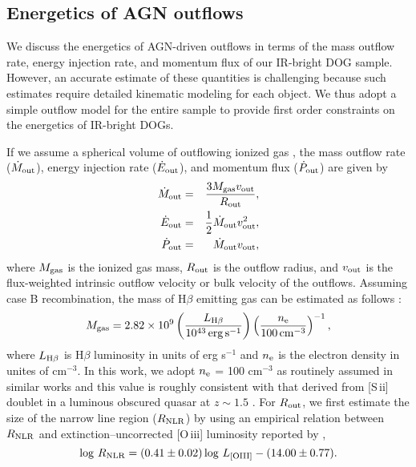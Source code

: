 \documentclass[twocolumn]{aastex6}
\newcommand{\oiii}{[O{\,\sc iii}]\,\,}
\newcommand{\sii}{[S{\,\sc ii}]\,\,}
\begin{document}
\subsection{Energetics of AGN outflows}
We discuss the energetics of AGN-driven outflows in terms of the mass outflow rate, energy injection rate, and momentum flux of our IR-bright DOG sample.
However, an accurate estimate of these quantities is challenging because such estimates require detailed kinematic modeling for each object.
We thus adopt a simple outflow model for the entire sample to provide first order constraints on
the energetics of IR-bright DOGs.
   
 
If we assume a spherical volume of outflowing ionized gas \citep[e.g.,][]{Harrison,Bae_17}, the mass outflow rate ($\dot{M}_{\rm out}$), energy injection rate ($\dot{E}_{\rm out}$), and momentum flux ($\dot{P}_{\rm out}$) are given by 
\begin{eqnarray}
\label{M}
\dot{M}_{\rm out}	&	=	& \frac{3 M_{\rm gas} v_{\rm out}}{R_{\rm out}}	,\\
\dot{E}_{\rm out}	&	=	& \frac{1}{2} \dot{M}_{\rm out} v_{\rm out}^2	,\\
\dot{P}_{\rm out}	&	=	& \dot{M}_{\rm out} v_{\rm out},	
\end{eqnarray}
where $M_{\rm gas}$ is the ionized gas mass, $R_{\rm out}$ is the outflow radius, and $v_{\rm out}$ is the flux-weighted intrinsic outflow velocity or bulk velocity of the outflows.
Assuming case B recombination, the mass of H$\beta$ emitting gas can be estimated as follows \citep{Nesvadba}:
\begin{equation}
M_{\rm gas} = 2.82\times 10^9 \left( \frac{L_{{\rm H}\beta}}{10^{43}\,{\rm erg}\,{\rm s}^{-1}} \right) \left(\frac{n_{\rm e}}{100\, {\rm cm}^{-3}} \right)^{-1},
\end{equation} 
where $L_{\rm H\beta}$ is H$\beta$ luminosity in units of erg s$^{-1}$ and $n_{\rm e}$ is the electron density in unites of cm$^{-3}$.
In this work, we adopt $n_{\rm e}$ = 100 cm$^{-3}$ as routinely assumed in similar works \citep[e.g.,][]{Liu_b,Brusa} and this value is roughly consistent with that derived from \sii doublet in a luminous obscured quasar at $z \sim 1.5$ \citep{Perna}.
For $R_{\rm out}$, we first estimate the size of the narrow line region ($R_{\rm NLR}$) by using an empirical relation between $R_{\rm NLR}$ and extinction--uncorrected \oiii luminosity reported by \cite{Bae_17},
\begin{equation}
\log \,R_{\rm NLR} = (0.41 \pm 0.02) \log \,L_{\rm [OIII]} - (14.00 \pm 0.77).
\end{equation}
\end{document}
